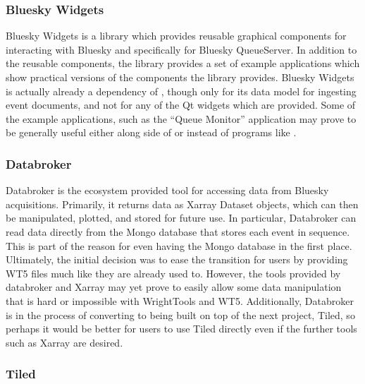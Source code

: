 \subsubsection{Bluesky Widgets}
Bluesky Widgets\cite{bluesky-widgets} is a library which provides reusable graphical components for interacting with Bluesky and specifically for Bluesky QueueServer.
In addition to the reusable components, the library provides a set of example applications which show practical versions of the components the library provides.
Bluesky Widgets is actually already a dependency of \blueskycmds{}, though only for its data model for ingesting event documents, and not for any of the Qt widgets which are provided.
Some of the example applications, such as the ``Queue Monitor'' application may prove to be generally useful either along side of or instead of programs like \blueskycmds{}.

\subsubsection{Databroker}
Databroker\cite{Arkilic2015} is the ecosystem provided tool for accessing data from Bluesky acquisitions.
Primarily, it returns data as Xarray\cite{Hoyer_2017} Dataset objects, which can then be manipulated, plotted, and stored for future use.
In particular, Databroker can read data directly from the Mongo database that stores each event in sequence.
This is part of the reason for even having the Mongo database in the first place.
Ultimately, the initial decision was to ease the transition for users by providing WT5 files much like they are already used to.
However, the tools provided by databroker and Xarray may yet prove to easily allow some data manipulation that is hard or impossible with WrightTools and WT5.
Additionally, Databroker is in the process of converting to being built on top of the next project, Tiled, so perhaps it would be better for users to use Tiled directly even if the further tools such as Xarray are desired.

\subsubsection{Tiled}

